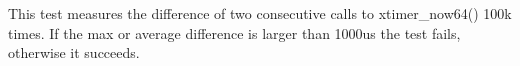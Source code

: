 This test measures the difference of two consecutive calls to xtimer\+\_\+now64() 100k times. If the max or average difference is larger than 1000us the test fails, otherwise it succeeds. 
